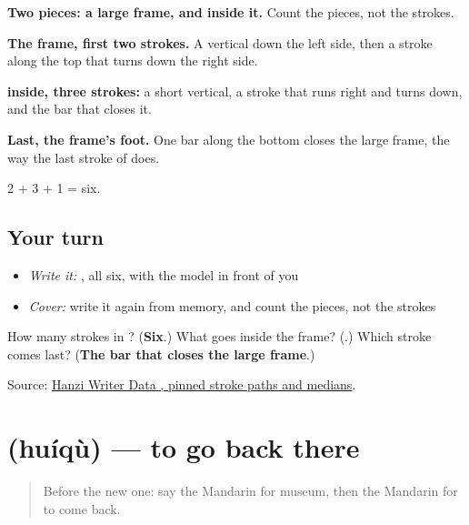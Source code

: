 \begin{quote}
\end{quote}

\textbf{Two pieces: a large frame, and  inside it.} Count the pieces, not the strokes.

\textbf{The frame, first two strokes.} A vertical down the left side, then a stroke along the top that turns down the right side.

\textbf{ inside, three strokes:} a short vertical, a stroke that runs right and turns down, and the bar that closes it.

\textbf{Last, the frame's foot.} One bar along the bottom closes the large frame, the way the last stroke of  does.

2 + 3 + 1 = six.

\subsection*{Your turn}
\begin{itemize}
\raggedright
  \item \emph{Write it:} , all six, with the model in front of you
  \item \emph{Cover:} write it again from memory, and count the pieces, not the strokes
\end{itemize}

\begin{tcolorbox}[breakable,colback=teal!4,colframe=teal!35!black,title={Before you move on}]
How many strokes in ? (\textbf{Six}.) What goes inside the frame? (\textbf{}.) Which stroke comes last? (\textbf{The bar that closes the large frame}.)

Source: \href{https://raw.githubusercontent.com/chanind/hanzi-writer-data/68d10a4b21150cae5e1ebbd223eed289cf32d90c/data/\%E5\%9B\%9E.json}{Hanzi Writer Data , pinned stroke paths and medians}.
\end{tcolorbox}
\section[\texorpdfstring{\zh{回去} (huíqù)}{回去 (huíqù)}]{ (huíqù) — to go back there}

\label{lesson:ZH-C191-huiqu}



\begin{quote}
Before the new one: say the Mandarin for museum, then the Mandarin for to come back.
\end{quote}

